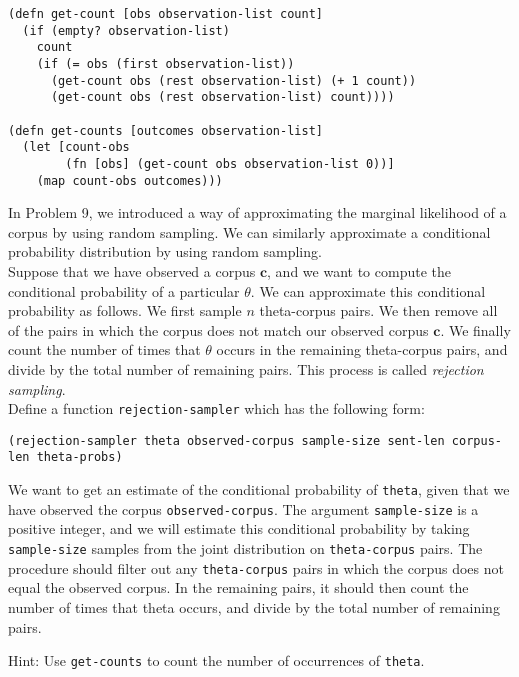 \documentclass[10pt]{article}
\begin{document}
\begin{lstlisting}
(defn get-count [obs observation-list count]
  (if (empty? observation-list)
    count
    (if (= obs (first observation-list))
      (get-count obs (rest observation-list) (+ 1 count))
      (get-count obs (rest observation-list) count))))

(defn get-counts [outcomes observation-list]
  (let [count-obs 
        (fn [obs] (get-count obs observation-list 0))]
    (map count-obs outcomes)))
\end{lstlisting}

\noindent In Problem 9, we introduced a way of approximating the marginal
likelihood of a corpus by using random sampling. We can similarly
approximate a conditional probability distribution by using random
sampling.
\\

\noindent Suppose that we have observed a corpus $\mathbf{c}$, and we
want to compute the conditional probability of a particular
$\theta$. We can approximate this conditional probability as
follows. We first sample $n$ theta-corpus pairs. We then remove all of
the pairs in which the corpus does not match our observed corpus
$\mathbf{c}$. We finally count the number of times that $\theta$
occurs in the remaining theta-corpus pairs, and divide by the total
number of remaining pairs. This process is called \textit{rejection
  sampling}.
\\

\noindent 
Define a function \texttt{rejection-sampler} which has the following
form:
 
\begin{lstlisting}
(rejection-sampler theta observed-corpus sample-size sent-len corpus-len theta-probs)
\end{lstlisting}

\noindent We want to get an estimate of the conditional probability of
\texttt{theta}, given that we have observed the corpus
\texttt{observed-corpus}. The argument \texttt{sample-size} is a positive integer,
and we will estimate this conditional probability by taking
\texttt{sample-size} samples from the joint distribution on
\texttt{theta-corpus} pairs. The procedure should filter out any
\texttt{theta-corpus} pairs in which the corpus does not equal the
observed corpus. In the remaining pairs, it should then count the
number of times that theta occurs, and divide by the total number of
remaining pairs.


\noindent Hint: Use \texttt{get-counts} to count the number of
occurrences of \texttt{theta}.
\end{document}
